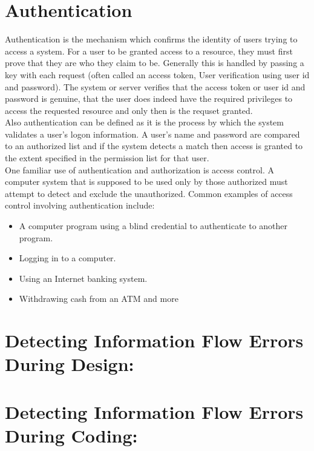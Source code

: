 \section{Authentication}
Authentication is the mechanism which confirms the identity of users trying to access a system. For a user to be granted access to a resource, they must first prove that they are who they claim to be. Generally this is handled by passing a key with each request (often called an access token, User verification using user id and password). The system or server verifies that the access token or user id and password is genuine, that the user does indeed have the required privileges to access the requested resource and only then is the requset granted.\\
Also authentication can be defined as it is the process by which the system validates a user's logon information. A user's name and password are compared to an authorized list and if the system detects a match then access is granted to the extent specified in the permission list for that user.\\

One familiar use of authentication and authorization is access control. A computer system that is supposed to be used only by those authorized must attempt to detect and exclude the unauthorized. Common examples of access control involving authentication include:
\begin{itemize}	
	\item A computer program using a blind credential to authenticate to another program.
	\item Logging in to a computer.	
	\item Using an Internet banking system.
	\item Withdrawing cash from an ATM and more
\end{itemize}

\section{ Detecting Information Flow Errors During Design:}

\section{ Detecting Information Flow Errors During Coding:}